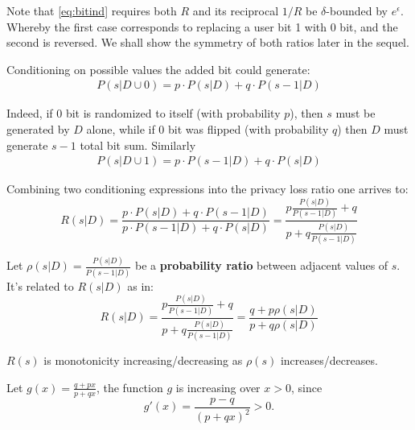 \documentclass[11pt]{article}
\begin{document}
Note that \ref{eq:bitind} requires both $R$ and its reciprocal $1/R$ be $\delta$-bounded by $e^\epsilon$. Whereby the first case corresponds to replacing a user bit 1 with 0 bit, and the second is reversed. We shall show the symmetry of both ratios later in the sequel. 

Conditioning on possible values the added bit could generate:
\begin{align}\label{lem:rs100}
P(s|D \cup 0) = p \cdot P(s | D ) + q \cdot P( s - 1 | D) 
\end{align}

Indeed, if $0$ bit is randomized to itself (with probability $p$), then $s$ must be generated by $D$ alone, while if $0$ bit was flipped (with probability $q$) then $D$ must generate $s-1$ total bit sum. Similarly 
\begin{align}
P(s|D \cup 1) = p  \cdot P(s -1 | D ) + q \cdot P( s  | D) 
\end{align}

Combining two conditioning expressions into the privacy loss ratio one arrives to:
\begin{equation} \label{eq:plratio}
R(s|D)=  \frac{p \cdot P(s | D ) + q \cdot P( s - 1 | D) } {  p  \cdot P(s -1 | D ) + q \cdot P( s  | D)  } = \frac{ p \frac{P(s | D )}{P(s - 1| D )} + q } { p + q \frac{P(s | D )}{P(s - 1| D )} }
\end{equation}

Let $\rho(s|D) = \frac{P(s | D )}{P(s - 1| D )}$ be a \textbf{probability ratio} between adjacent values of $s$.  It's related to $R(s|D)$ as in:
\begin{equation} \label{eq:plratio1}
R(s|D) =  \frac{ p \frac{P(s | D )}{P(s - 1| D )} + q } { p + q \frac{P(s | D )}{P(s - 1| D )} } = \frac{q + p\rho(s|D)}{p + q\rho(s|D)}
\end{equation}

\begin{cor}\label{cr:phr}  $R(s)$ is monotonicity increasing/decreasing as $\rho(s)$ increases/decreases.
\begin{pf}
Let $g(x) = \frac{q + px}{p + qx}$, the function $g$ is increasing over $x>0$, since
\[ g'(x) = \frac{p-q}{(p+qx)^2} > 0. \]
\end{pf}
\end{cor}
 
\end{document}
